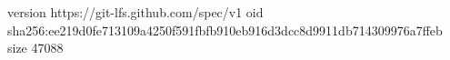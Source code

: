 version https://git-lfs.github.com/spec/v1
oid sha256:ee219d0fe713109a4250f591fbfb910eb916d3dcc8d9911db714309976a7ffeb
size 47088
